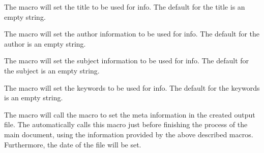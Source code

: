 
\DescribeMacro{\skbtitle}
The macro \cmd{\skbtitle} will set the title to be used for  info. The default for the title is an empty string.

\DescribeMacro{\skbauthor}
The macro \cmd{\skbauthor} will set the author information to be used for  info. The default for the author is an empty string.

\DescribeMacro{\skbsubject}
The macro \cmd{\skbsubject} will set the subject information to be used for  info. The default for the subject is an empty string.

\DescribeMacro{\skbkeywords}
The macro \cmd{\skbkeywords} will set the keywords to be used for  info. The default for the keywords is an empty string.

\DescribeMacro{\skbpdfinfo}
The macro  will call the macro \cmd{\pdfinfo} to set the meta information
in the created  output file. The  automatically calls this macro just before finishing
the process of the main document, using the information provided by the above described macros.
Furthermore, the date of the  file will be set.
